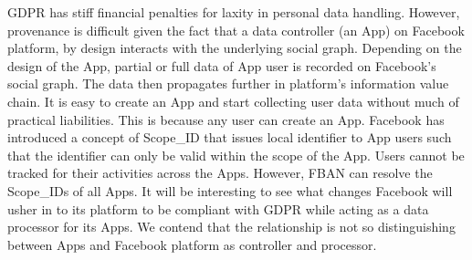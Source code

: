 \documentclass[runningheads]{llncs}
\begin{document}
GDPR has stiff financial penalties for laxity in personal data
handling. However, provenance is difficult given the fact that a data
controller (an App) on Facebook platform, by design interacts with the
underlying social graph. Depending on the design of the App, partial
or full data of App user is recorded on Facebook's social graph. The
data then propagates further in platform's information value chain. It
is easy to create an App and start collecting user data without much
of practical liabilities. This is because any user can create an App.
Facebook has introduced a concept of Scope\_ID that issues local
identifier to App users such that the identifier can only be valid
within the scope of the App. Users cannot be tracked for their
activities across the Apps. However, FBAN can resolve the Scope\_IDs
of all Apps. It will be interesting to see what changes Facebook will
usher in to its platform to be compliant with GDPR while acting as a
data processor for its Apps. We contend that the relationship is not
so distinguishing between Apps and Facebook platform as controller and
processor. 




\end{document}
